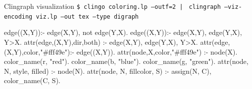\begin{frame}[fragile,shrink=1]{Clingraph visualization}
%
\mbox{\texttt{\$ clingo coloring.lp --outf=2 |}}
\mbox{\texttt{\;\; clingraph --viz-encoding viz.lp --out tex --type digraph }}
\pause
\small
\begin{semiverbatim}

edge((X,Y)):- edge(X,Y), not edge(Y,X).
edge((X,Y)):- edge(X,Y), edge(Y,X), Y>X.
\pause
attr(edge,(X,Y),dir,both)       :- edge(X,Y), edge(Y,X), Y>X.
attr(edge,(X,Y),color,"#fff49e"):- edge((X,Y)).
attr(node,X,color,"#fff49e")    :- node(X).
\pause
color_name(r, "red"). color_name(b, "blue").
color_name(g, "green").
attr(node, N, style, filled) :- node(N).
attr(node, N, fillcolor, S)  :- assign(N, C), color_name(C, S).
\end{semiverbatim}
\end{frame}
%
